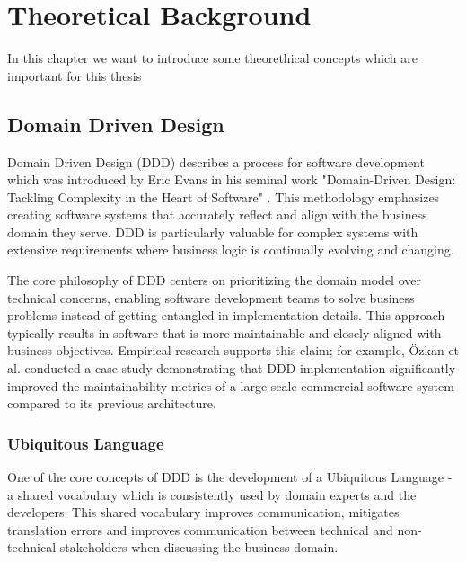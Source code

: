 \chapter{Theoretical Background}\label{chapter:theoreticalbg}
In this chapter we want to introduce some theorethical concepts which are important for this thesis

\section{Domain Driven Design}\label{sec:ddd}
Domain Driven Design (DDD) describes a process for software development which was introduced by Eric Evans in his seminal work "Domain-Driven Design: Tackling Complexity in the Heart of Software" \autocite{evans2004domain}. This methodology emphasizes creating software systems that accurately reflect and align with the business domain they serve. DDD is particularly valuable for complex systems with extensive requirements where business logic is continually evolving and changing.

The core philosophy of DDD centers on prioritizing the domain model over technical concerns, enabling software development teams to solve business problems instead of getting entangled in implementation details. This approach typically results in software that is more maintainable and closely aligned with business objectives. Empirical research supports this claim; for example, Özkan et al. \autocite{ddd-maintainability} conducted a case study demonstrating that DDD implementation significantly improved the maintainability metrics of a large-scale commercial software system compared to its previous architecture.

\subsection{Ubiquitous Language}
One of the core concepts of DDD is the development of a Ubiquitous Language - a shared vocabulary which is consistently used by domain experts and the developers. This shared vocabulary improves communication, mitigates translation errors and improves communication between technical and non-technical stakeholders when discussing the business domain.

